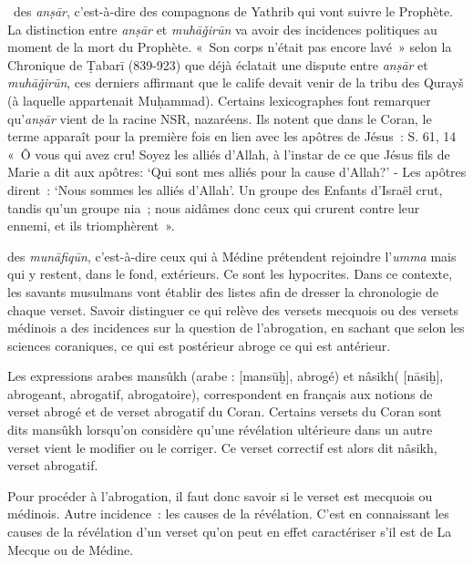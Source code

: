 \item~des \emph{anṣār}, c'est-à-dire des compagnons de Yathrib qui vont
suivre le Prophète. La distinction entre \emph{anṣār} et
\emph{muhāǧirūn} va avoir des incidences politiques au moment de la mort
du Prophète. «~Son corps n'était pas encore lavé~» selon la Chronique de
Ṭabarī (839-923) que déjà
éclatait une dispute entre \emph{anṣār} et \emph{muhāǧirūn}, ces
derniers affirmant que le calife devait venir de la tribu des Qurayš (à
laquelle appartenait Muḥammad). Certains lexicographes font remarquer
qu'\emph{anṣār} vient de la racine NSR, nazaréens. Ils notent que dans
le Coran, le terme apparaît pour la première fois en lien avec les
apôtres de Jésus~: S. 61, 14 «~Ô vous qui avez cru! Soyez les alliés
d'Allah, à l'instar de ce que Jésus fils de Marie a dit aux apôtres:
`Qui sont mes alliés pour la cause d'Allah?' - Les apôtres dirent~:
`Nous sommes les alliés d'Allah'. Un groupe des Enfants d'Israël crut,
tandis qu'un groupe nia~; nous aidâmes donc ceux qui crurent contre leur
ennemi, et ils triomphèrent~».

\item des \emph{munāfiqūn}, c'est-à-dire ceux qui à Médine prétendent
rejoindre l'\emph{umma} mais qui y restent, dans le fond, extérieurs. Ce
sont les hypocrites.
\ei 
Dans ce contexte, les savants musulmans vont établir des listes afin de
dresser la chronologie de chaque verset. Savoir distinguer ce qui relève
des versets mecquois ou des versets médinois a des incidences sur la
question de l'abrogation, en sachant que selon les sciences coraniques,
ce qui est postérieur abroge ce qui est antérieur.
\begin{Def}
\label{mansûkh}
Les expressions arabes mansûkh (arabe :
[mansūḫ], abrogé) et nâsikh( 
[nāsiḫ], abrogeant, abrogatif, abrogatoire), correspondent en français aux notions de verset abrogé et de verset abrogatif du Coran. Certains versets du Coran sont dits mansûkh lorsqu'on considère qu'une révélation ultérieure dans un autre verset vient le modifier ou le corriger. Ce verset correctif est alors dit nâsikh, verset abrogatif.
\end{Def}
Pour procéder à
l'abrogation, il faut donc savoir si le verset est mecquois ou médinois.
Autre incidence~: les causes de la révélation. C'est en connaissant les
causes de la révélation d'un verset qu'on peut en effet caractériser
s'il est de La Mecque ou de Médine.

